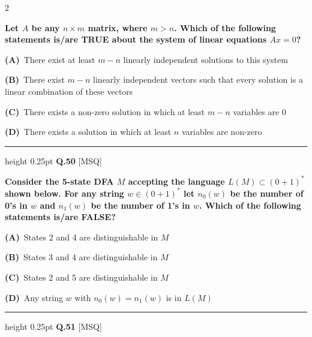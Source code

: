 \documentclass[a4paper,10pt,twoside]{article}
\begin{document}
\begin{multicols}{2}
{\bfseries Let $A$ be any $n \times m$ matrix, where $m > n$. Which of the following statements is/are TRUE about the system of linear equations $Ax = 0$? \par}
\par\vspace{2pt}\noindent
\textbf{(A)}~There exist at least $m-n$ linearly independent solutions to this system\par\vspace{2pt}\noindent
\textbf{(B)}~There exist $m-n$ linearly independent vectors such that every solution is a linear combination of these vectors\par\vspace{2pt}\noindent
\textbf{(C)}~There exists a non-zero solution in which at least $m-n$ variables are 0\par\vspace{2pt}\noindent
\textbf{(D)}~There exists a solution in which at least $n$ variables are non-zero
\par\vspace{6pt}\hrule height 0.25pt\vspace{6pt}
\noindent\textbf{Q.50} \hfill {\footnotesize\textsf{[MSQ]}}
\par\vspace{2pt}
{\bfseries Consider the 5-state DFA $M$ accepting the language $L(M) \subset (0 + 1)^*$ shown below. For any string $w \in (0 + 1)^*$ let $n_0(w)$ be the number of 0's in $w$ and $n_1(w)$ be the number of 1's in $w$.
Which of the following statements is/are FALSE? \par}
\par\vspace{2pt}\noindent
\textbf{(A)}~States 2 and 4 are distinguishable in $M$\par\vspace{2pt}\noindent
\textbf{(B)}~States 3 and 4 are distinguishable in $M$\par\vspace{2pt}\noindent
\textbf{(C)}~States 2 and 5 are distinguishable in $M$\par\vspace{2pt}\noindent
\textbf{(D)}~Any string $w$ with $n_0(w) = n_1(w)$ is in $L(M)$
\par\vspace{6pt}\hrule height 0.25pt\vspace{6pt}
\noindent\textbf{Q.51} \hfill {\footnotesize\textsf{[MSQ]}}
\par\vspace{2pt}

\end{multicols}
\end{document}
